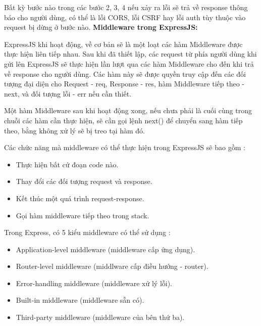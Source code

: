Bất kỳ bước nào trong các bước 2, 3, 4 nếu xảy ra lỗi sẽ trả về response thông báo cho người dùng, có thể là lỗi CORS, lỗi CSRF hay lỗi auth tùy thuộc vào request bị dừng ở bước nào.
\textbf{Middleware trong ExpressJS:} 

ExpressJS khi hoạt động, về cơ bản sẽ là một loạt các hàm Middleware được thực hiện liên tiếp nhau. Sau khi đã thiết lập, các request từ phía người dùng khi gửi lên ExpressJS sẽ thực hiện lần lượt qua các hàm Middleware cho đến khi trả về response cho người dùng. Các hàm này sẽ được quyền truy cập đến các đối tượng đại diện cho Request - req, Response - res, hàm Middleware tiếp theo - next, và đối tượng lỗi - err nếu cần thiết.

Một hàm Middleware sau khi hoạt động xong, nếu chưa phải là cuối cùng trong chuỗi các hàm cần thực hiện, sẽ cần gọi lệnh next() để chuyển sang hàm tiếp theo, bằng không xử lý sẽ bị treo tại hàm đó.

Các chức năng mà middleware có thể thực hiện trong ExpressJS sẽ bao gồm :
\begin{itemize}
  \item Thực hiện bất cứ đoạn code nào.
  \item Thay đổi các đối tượng request và response.
  \item Kết thúc một quá trình request-response.
  \item Gọi hàm middleware tiếp theo trong stack.
\end{itemize}

Trong Express, có 5 kiểu middleware có thể sử dụng :
\begin{itemize}
  \item Application-level middleware (middleware cấp ứng dụng).
  \item Router-level middleware (middlware cấp điều hướng - router).
  \item Error-handling middleware (middleware xử lý lỗi).
  \item Built-in middleware (middleware sẵn có).
  \item Third-party middleware (middleware của bên thứ ba).
\end{itemize}
